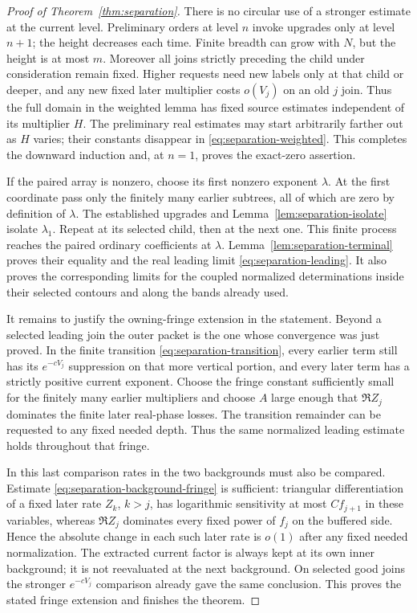 \begin{proof}[Proof of Theorem~\ref{thm:separation}]
There is no circular use of a stronger estimate at the current
level.  Preliminary orders at level $n$ invoke upgrades only
at level $n+1$; the height decreases each time.  Finite breadth
can grow with $N$, but the height is at most $m$.
Moreover all joins strictly preceding the child under
consideration remain fixed.  Higher requests need new labels
only at that child or deeper, and any new fixed later
multiplier costs $o(V_j)$ on an old $j$ join.  Thus the full
domain in the weighted lemma has fixed source estimates
independent of its multiplier $H$.  The preliminary real
estimates may start arbitrarily farther out as $H$ varies;
their constants disappear in
\eqref{eq:separation-weighted}.  This completes the downward
induction and, at $n=1$, proves the exact-zero assertion.

If the paired array is nonzero, choose its first nonzero
exponent $\lambda$.  At the first coordinate pass only the
finitely many earlier subtrees, all of which are zero by
definition of $\lambda$.  The established upgrades and
Lemma~\ref{lem:separation-isolate} isolate $\lambda_1$.
Repeat at its selected child, then at the next one.  This
finite process reaches the paired ordinary coefficients at
$\lambda$.  Lemma~\ref{lem:separation-terminal} proves their
equality and the real leading limit
\eqref{eq:separation-leading}.  It also proves the corresponding
limits for the coupled normalized determinations inside their
selected contours and along the bands already used.

It remains to justify the owning-fringe extension in the
statement.  Beyond a selected leading join the outer packet
is the one whose convergence was just proved.  In the finite
transition \eqref{eq:separation-transition}, every earlier
term still has its $e^{-cV_j}$ suppression on that more
vertical portion, and every later term has a strictly positive
current exponent.  Choose the fringe constant sufficiently
small for the finitely many earlier multipliers and choose
$A$ large enough that $\Re Z_j$ dominates the finite later
real-phase losses.  The transition remainder can be requested
to any fixed needed depth.  Thus the same normalized leading
estimate holds throughout that fringe.

In this last comparison rates in the two backgrounds must
also be compared.  Estimate
\eqref{eq:separation-background-fringe} is sufficient: triangular
differentiation of a fixed later rate $Z_k$, $k>j$, has
logarithmic sensitivity at most $C f_{j+1}$ in these variables,
whereas $\Re Z_j$ dominates every fixed power of $f_j$ on the
buffered side.  Hence the absolute change in each such later
rate is $o(1)$ after any fixed needed normalization.  The
extracted current factor is always kept at its own inner
background; it is not reevaluated at the next background.
On selected good joins the stronger $e^{-cV_j}$ comparison
already gave the same conclusion.  This proves the stated
fringe extension and finishes the theorem.
\end{proof}


